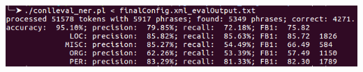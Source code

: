 \documentclass[11pt, english]{article}
\begin{document}
\includegraphics[width=\linewidth, keepaspectratio]{gfx/finalEvalOut.png}
\label{fig:finalResult}
\end{document}
